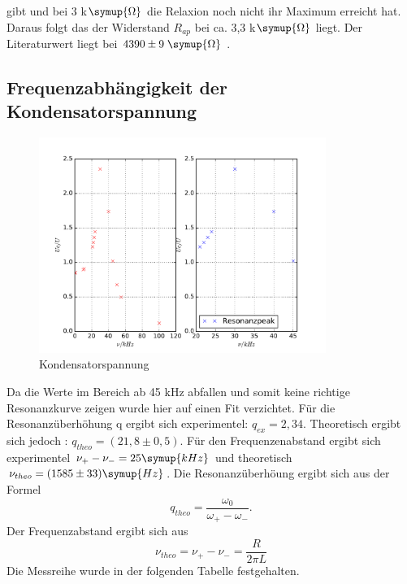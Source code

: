       gibt und bei 3 k$\symup{\Omega}$ die Relaxion noch nicht
      ihr Maximum erreicht hat. Daraus folgt das der Widerstand $R_{ap}$ bei ca.
      3,3 k$\symup{\Omega}$ liegt. Der Literaturwert liegt bei
      $4390 \pm 9 \;\symup{\Omega}$ .

  \subsection{Frequenzabhängigkeit der Kondensatorspannung}
  \begin{figure}
    \centering
    \includegraphics[height=7cm]{./plots/5cplot.pdf}
      \caption{Kondensatorspannung}
      \label{fig:5cplot}
    \end{figure}
    \FloatBarrier
    Da die Werte im Bereich
    ab 45 kHz abfallen und somit keine richtige Resonanzkurve zeigen
     wurde hier auf einen Fit verzichtet.
    Für die Resonanzüberhöhung q ergibt sich experimentel: $q_{ex}= 2,34 $.
    Theoretisch ergibt sich jedoch : $q_{theo}= (21,8  \pm 0,5) $.
    Für den Frequenzenabstand ergibt sich experimentel $ \nu_+ - \nu_- = 25 \symup{kHz} $
    und theoretisch $ \nu_{theo}= (1585 \pm 33)\symup{Hz}$.
    Die Resonanzüberhöung ergibt sich aus der Formel
    \begin{equation*}
      q_{theo} = \frac{\omega_0}{\omega_+ - \omega_-}.
    \end{equation*}
    Der Frequenzabstand ergibt sich aus
    \begin{equation*}
      \nu_{theo} = \nu_+ - \nu_- = \frac{R}{2\pi L}
    \end{equation*}
    Die Messreihe wurde in der folgenden Tabelle festgehalten.
